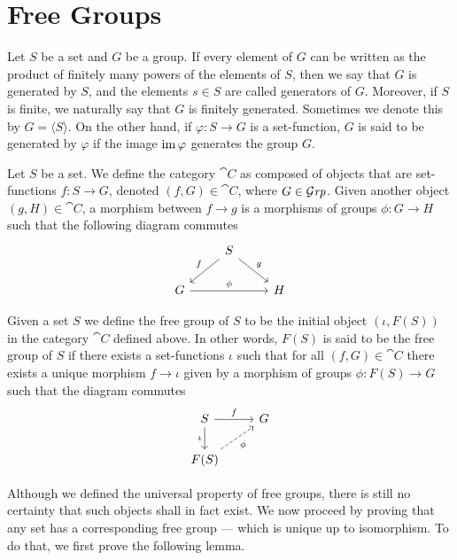 \section{Free Groups}

\begin{definition}
\label{def:group-generated}
Let \(S\) be a set and \(G\) be a group. If every element of \(G\) can be
written as the product of finitely many powers of the elements of \(S\), then we
say that \(G\) is generated by \(S\), and the elements \(s \in S\) are called
generators of \(G\). Moreover, if \(S\) is finite, we naturally say that \(G\)
is finitely generated. Sometimes we denote this by \(G = \langle S \rangle\).  On the other
hand, if \(\varphi: S \to G\) is a set-function, \(G\) is said to be generated by \(\varphi\)
if the image \(\operatorname{im} \varphi\) generates the group \(G\).
\end{definition}

Let \(S\) be a set. We define the category \(\cat C\) as composed of objects
that are set-functions \(f: S \to G\), denoted \((f, G) \in \cat C\), where \(G \in
{\mathcal{G}\textit{rp}}\). Given another object \((g, H) \in \cat C\), a morphism between \(f \to g\)
is a morphisms of groups \(\phi: G \to H\) such that the following diagram commutes
\[
  \begin{tikzcd}
    &S \ar[dr, "g"] \ar[dl, swap, "f"] & \\
    G \ar[rr, "\phi"] & &H
  \end{tikzcd}
\]

\begin{proposition}
\label{prop:free-group-universal-property}
Given a set \(S\) we define the free group of \(S\) to be the initial object
\((\iota, F(S))\) in the category \(\cat C\) defined above. In other words,
\(F(S)\) is said to be the free group of \(S\) if there exists a set-functions
\(\iota\) such that for all \((f, G) \in \cat C\) there exists a unique morphism \(f
\to \iota\) given by a morphism of groups \(\phi: F(S) \to G\) such that the diagram
commutes
\[
  \begin{tikzcd}
    S \ar[d, swap, "\iota"] \ar[r, "f"] & G \\
    F(S) \ar[ur, dashed, swap, "\phi"] &
  \end{tikzcd}
\]
\end{proposition}

Although we defined the universal property of free groups, there is still no
certainty that such objects shall in fact exist. We now proceed by proving that
any set has a corresponding free group --- which is unique up to isomorphism. To
do that, we first prove the following lemma.


